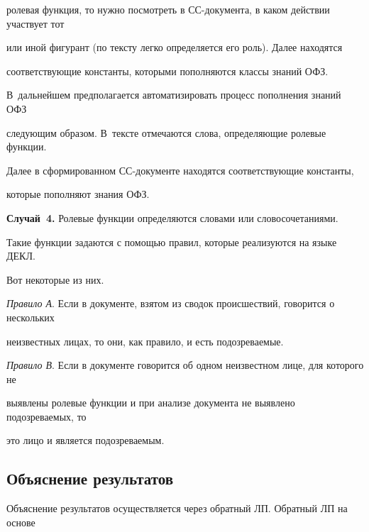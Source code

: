 ролевая функция, то нужно посмотреть в СС-документа, в каком действии участвует тот 


или иной фигурант (по тексту легко определяется его роль). Далее находятся 


соответствующие константы, которыми пополняются классы знаний ОФЗ. 


В~дальнейшем предполагается автоматизировать процесс пополнения знаний ОФЗ 


следующим образом. В~тексте отмечаются слова, определяющие ролевые функции. 


Далее в сформированном СС-документе находятся соответствующие константы, 


которые пополняют знания ОФЗ.


 


\medskip





\noindent


\textbf{Случай~4.} Ролевые функции определяются словами или словосочетаниями.





       Такие функции задаются с помощью правил, которые реализуются на языке ДЕКЛ. 


Вот некоторые из них.





\textit{Правило А}. Если в документе, взятом из сводок происшествий, говорится о нескольких 


неизвестных лицах, то они, как правило, и есть подозреваемые. 





\textit{Правило В}. Если в документе говорится об одном неизвестном лице, для которого не 


выявлены ролевые функции и при анализе документа не выявлено подозреваемых, то 


это лицо и является подозреваемым. 


 


\subsection{Объяснение результатов}


    


       Объяснение результатов осуществляется через обратный ЛП. Обратный ЛП на основе 


